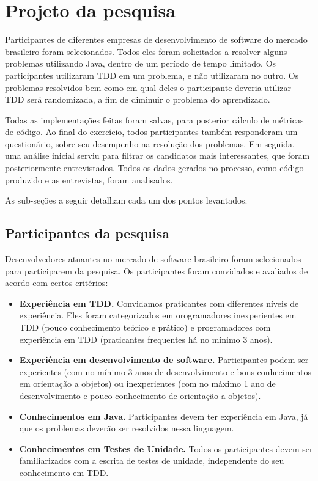 \section{Projeto da pesquisa}

Participantes de diferentes empresas de desenvolvimento de software do mercado
brasileiro foram selecionados. Todos eles foram solicitados a resolver 
alguns problemas utilizando Java, dentro de um período de tempo limitado. 
Os participantes utilizaram TDD em um problema, e não utilizaram
no outro. Os problemas resolvidos bem como em qual deles o participante
deveria utilizar TDD será randomizada, a fim de diminuir o problema do aprendizado.

Todas as implementações feitas foram salvas, para posterior
cálculo de métricas de código. Ao final do exercício, todos participantes
também responderam um questionário, sobre seu desempenho na resolução dos problemas.
Em seguida, uma análise inicial serviu para filtrar os candidatos
mais interessantes, que foram posteriormente entrevistados. 
Todos os dados gerados no processo, 
como código produzido e as entrevistas, foram analisados.

As sub-seções a seguir detalham cada um dos pontos levantados.

\subsection{Participantes da pesquisa}
\label{sec:planejamento-participantes}

Desenvolvedores atuantes no mercado de 
software brasileiro foram selecionados para participarem da pesquisa.
Os participantes foram convidados e avaliados de acordo com certos critérios:

\begin{itemize}
	\item \textbf{Experiência em TDD.} Convidamos praticantes com diferentes
	níveis de experiência. Eles foram categorizados em orogramadores inexperientes em TDD (pouco conhecimento teórico e prático)
	e programadores com experiência em TDD (praticantes frequentes há no mínimo 3 anos).
	
	\item \textbf{Experiência em desenvolvimento de software.} Participantes podem ser
	experientes (com no mínimo 3 anos de desenvolvimento e bons conhecimentos em orientação a objetos) ou 
	inexperientes (com no máximo 1 ano de desenvolvimento e pouco conhecimento de orientação a objetos).

	\item \textbf{Conhecimentos em Java.} 
	Participantes devem ter experiência em Java, já que os problemas deverão ser resolvidos
	nessa linguagem.	
	
	\item \textbf{Conhecimentos em Testes de Unidade.} Todos os participantes devem ser
	familiarizados com a escrita de testes de unidade, independente do seu conhecimento
	em TDD.

\end{itemize}

